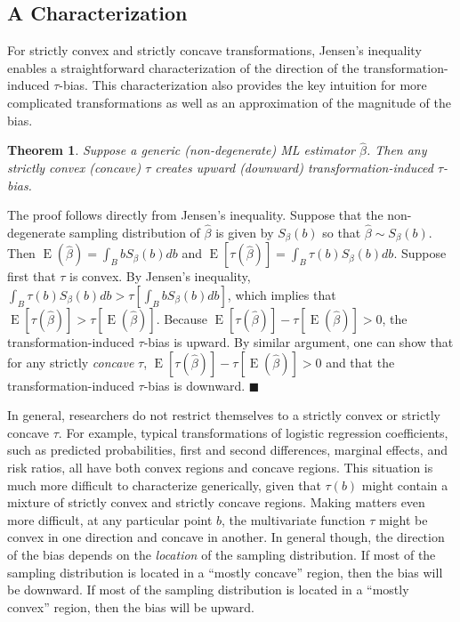 \documentclass[12pt]{article}
\newtheorem{theorem}{Theorem}
\newenvironment{proof}[1][Proof]{\begin{trivlist}
\item[\hskip \labelsep {\bfseries #1}]}{\end{trivlist}}
\DeclareMathOperator*{\E}{\text{E}}
\begin{document}
\subsection*{A Characterization}

For strictly convex and strictly concave transformations, Jensen's inequality enables a straightforward characterization of the direction of the transformation-induced $\tau$-bias. 
This characterization also provides the key intuition for more complicated transformations as well as an approximation of the magnitude of the bias.
\begin{theorem}
Suppose a generic (non-degenerate) ML estimator $\hat{\beta}$. Then any strictly convex (concave) $\tau$ creates upward (downward) transformation-induced $\tau$-bias.
\end{theorem} 
\begin{proof}
The proof follows directly from Jensen's inequality. 
Suppose that the non-degenerate sampling distribution of $\hat{\beta}$ is given by $S_\beta(b)$ so that $\hat{\beta} \sim S_\beta(b)$. 
Then $\E(\hat{\beta}) = \int_{B}bS_\beta(b)db$ and $\E[\tau(\hat{\beta})]  = \int_{B}\tau(b)S_\beta(b)db$. 
Suppose first that $\tau$ is convex. 
By Jensen's inequality, $\int_{B}\tau(b)S_\beta(b)db > \tau \left[ \int_{B}bS_\beta(b)db \right]$, which implies that $\E[\tau(\hat{\beta})] > \tau[\E(\hat{\beta})]$. 
Because $\E[\tau(\hat{\beta})] - \tau[\E(\hat{\beta})] > 0$, the transformation-induced $\tau$-bias is upward. 
By similar argument, one can show that for any strictly \textit{concave} $\tau$, $\E[\tau(\hat{\beta})] - \tau[\E(\hat{\beta})] > 0$ and that the transformation-induced $\tau$-bias is downward. $\blacksquare$
\end{proof}

In general, researchers do not restrict themselves to a strictly convex or strictly concave $\tau$. 
For example, typical transformations of logistic regression coefficients, such as predicted probabilities, first and second differences, marginal effects, and risk ratios, all have both convex regions and concave regions. 
This situation is much more difficult to characterize generically, given that $\tau(b)$ might contain a mixture of strictly convex and strictly concave regions. 
Making matters even more difficult, at any particular point $b$, the multivariate function $\tau$ might be convex in one direction and concave in another. 
In general though, the direction of the bias depends on the \textit{location} of the sampling distribution. 
If most of the sampling distribution is located in a ``mostly concave'' region, then the bias will be downward. 
If most of the sampling distribution is located in a ``mostly convex'' region, then the bias will be upward. 
\end{document}
